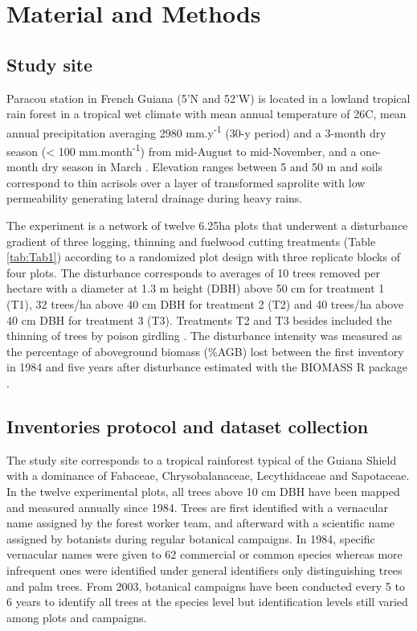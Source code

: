 \documentclass[fleqn,10pt]{ArtEcoFoG} %
\begin{document}
\section{Material and Methods}\label{material-and-methods}

\subsection{Study site}\label{study-site}

Paracou station in French Guiana (5'N and
52'W) is located in a lowland tropical rain forest in a
tropical wet climate with mean annual temperature of 26\textdegree C,
mean annual precipitation averaging 2980 mm.y\textsuperscript{-1} (30-y
period) and a 3-month dry season (\textless{} 100
mm.month\textsuperscript{-1}) from mid-August to mid-November, and a
one-month dry season in March \citep{Wagner2011}. Elevation ranges
between 5 and 50 m and soils correspond to thin acrisols over a layer of
transformed saprolite with low permeability generating lateral drainage
during heavy rains.

The experiment is a network of twelve 6.25ha plots that underwent a
disturbance gradient of three logging, thinning and fuelwood cutting
treatments (Table \ref{tab:Tab1}) according to a randomized plot design
with three replicate blocks of four plots. The disturbance corresponds
to averages of 10 trees removed per hectare with a diameter at 1.3 m
height (DBH) above 50 cm for treatment 1 (T1), 32 trees/ha above 40 cm
DBH for treatment 2 (T2) and 40 trees/ha above 40 cm DBH for treatment 3
(T3). Treatments T2 and T3 besides included the thinning of trees by
poison girdling \citep{Schmitt1990, Blanc2009}. The disturbance
intensity was measured as the percentage of aboveground biomass (\%AGB)
lost between the first inventory in 1984 and five years after
disturbance \citep{Piponiot2016} estimated with the BIOMASS R package
\citep{Biomass2018}.

\subsection{Inventories protocol and dataset
collection}\label{inventories-protocol-and-dataset-collection}

The study site corresponds to a tropical rainforest typical of the
Guiana Shield with a dominance of Fabaceae, Chrysobalanaceae,
Lecythidaceae and Sapotaceae. In the twelve experimental plots, all
trees above 10 cm DBH have been mapped and measured annually since 1984.
Trees are first identified with a vernacular name assigned by the forest
worker team, and afterward with a scientific name assigned by botanists
during regular botanical campaigns. In 1984, specific vernacular names
were given to 62 commercial or common species whereas more infrequent
ones were identified under general identifiers only distinguishing trees
and palm trees. From 2003, botanical campaigns have been conducted every
5 to 6 years to identify all trees at the species level but
identification levels still varied among plots and campaigns.
\end{document}
